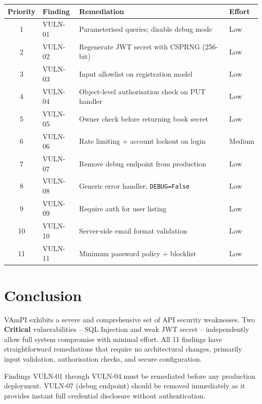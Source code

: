 \documentclass[11pt,a4paper]{article}
\begin{document}
\begin{center}
\begin{tabularx}{\textwidth}{clXl}
  \toprule
  \textbf{Priority} & \textbf{Finding} & \textbf{Remediation} & \textbf{Effort} \\
  \midrule
  1 & VULN-01 & Parameterised queries; disable debug mode       & Low \\
  2 & VULN-02 & Regenerate JWT secret with CSPRNG (256-bit)     & Low \\
  3 & VULN-03 & Input allowlist on registration model           & Low \\
  4 & VULN-04 & Object-level authorisation check on PUT handler & Low \\
  5 & VULN-05 & Owner check before returning book secret        & Low \\
  6 & VULN-06 & Rate limiting + account lockout on login        & Medium \\
  7 & VULN-07 & Remove debug endpoint from production           & Low \\
  8 & VULN-08 & Generic error handler; \texttt{DEBUG=False}     & Low \\
  9 & VULN-09 & Require auth for user listing                   & Low \\
  10 & VULN-10 & Server-side email format validation            & Low \\
  11 & VULN-11 & Minimum password policy + blocklist            & Low \\
  \bottomrule
\end{tabularx}
\end{center}

\section{Conclusion}

VAmPI exhibits a severe and comprehensive set of API security weaknesses. Two \textbf{Critical} vulnerabilities -- SQL Injection and weak JWT secret -- independently allow full system compromise with minimal effort. All 11 findings have straightforward remediations that require no architectural changes, primarily input validation, authorisation checks, and secure configuration.

\vspace{1em}
\begin{tcolorbox}[colback=critred!10,colframe=critred,title=\textbf{Immediate Action Required}]
Findings VULN-01 through VULN-04 must be remediated before any production deployment. VULN-07 (debug endpoint) should be removed immediately as it provides instant full credential disclosure without authentication.
\end{tcolorbox}
\end{document}
